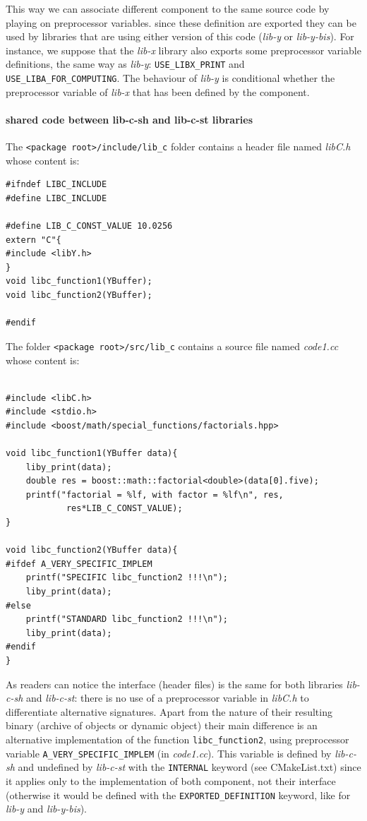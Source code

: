 \documentclass[12pt,a4paper]{article}
\begin{document}
This way we can associate different component to the same source code by playing on preprocessor variables. since these definition are exported they can be used by libraries that are using either version of this code (\textit{lib-y} or \textit{lib-y-bis}). For instance, we suppose that the \textit{lib-x} library also exports some preprocessor variable definitions, the same way as \textit{lib-y}: \texttt{USE\_LIBX\_PRINT} and \texttt{USE\_LIBA\_FOR\_COMPUTING}. The behaviour of \textit{lib-y} is conditional whether the preprocessor variable of \textit{lib-x} that has been defined by the component.

\paragraph{shared code between lib-c-sh and lib-c-st libraries}
The \texttt{<package root>/include/lib\_c} folder contains a header file named \textit{libC.h} whose content is: 
\begin{verbatim}
#ifndef LIBC_INCLUDE
#define LIBC_INCLUDE

#define LIB_C_CONST_VALUE 10.0256
extern "C"{
#include <libY.h> 
}
void libc_function1(YBuffer);
void libc_function2(YBuffer);

#endif
\end{verbatim}
The folder \texttt{<package root>/src/lib\_c} contains a source file named \textit{code1.cc} whose content is: 
\begin{verbatim}

#include <libC.h>
#include <stdio.h>
#include <boost/math/special_functions/factorials.hpp>

void libc_function1(YBuffer data){
    liby_print(data);
    double res = boost::math::factorial<double>(data[0].five);
    printf("factorial = %lf, with factor = %lf\n", res, 
            res*LIB_C_CONST_VALUE);
}

void libc_function2(YBuffer data){
#ifdef A_VERY_SPECIFIC_IMPLEM
    printf("SPECIFIC libc_function2 !!!\n");
    liby_print(data);
#else
    printf("STANDARD libc_function2 !!!\n");
    liby_print(data);
#endif
}
\end{verbatim}

As readers can notice the interface (header files) is the same for both libraries \textit{lib-c-sh} and \textit{lib-c-st}: there is no use of a  preprocessor variable in \textit{libC.h} to differentiate alternative signatures. Apart from the nature of their resulting binary (archive of objects or dynamic object) their main difference is an alternative implementation of the function \texttt{libc\_function2}, using preprocessor variable \texttt{A\_VERY\_SPECIFIC\_IMPLEM} (in \textit{code1.cc}). This variable is defined by \textit{lib-c-sh} and undefined by \textit{lib-c-st} with the \texttt{INTERNAL} keyword (see CMakeList.txt) since it applies only to the implementation of both component, not their interface (otherwise it would be defined with the \texttt{EXPORTED\_DEFINITION} keyword, like for \textit{lib-y} and \textit{lib-y-bis}). 
\end{document}
